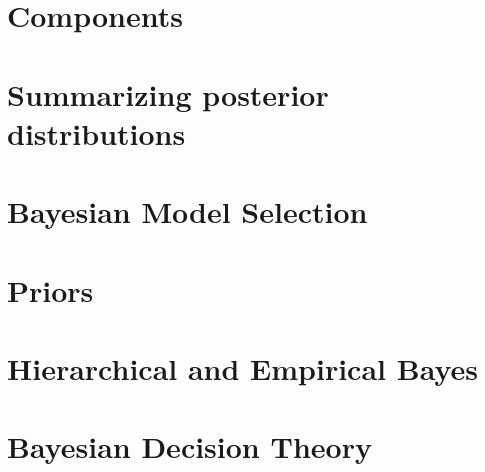 \section{Components}


\section{Summarizing posterior distributions}


\section{Bayesian Model Selection}

 
\section{Priors}


\section{Hierarchical and Empirical Bayes}


\section{Bayesian Decision Theory}



